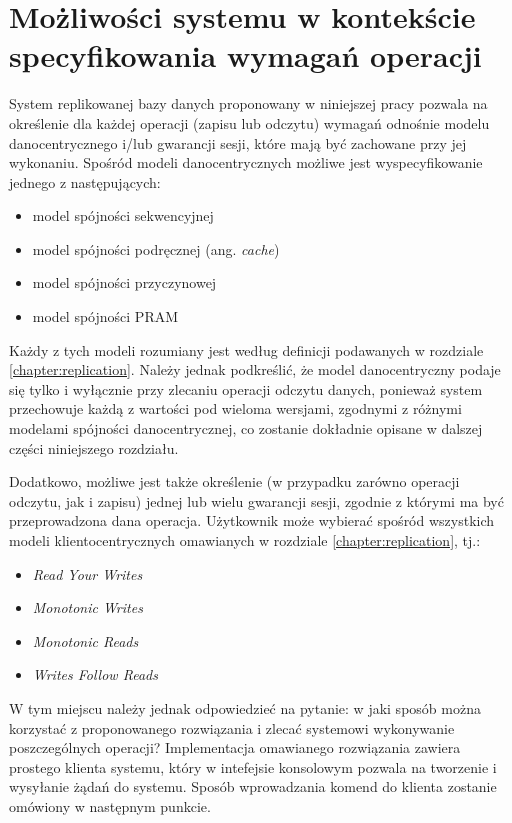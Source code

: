 \section{Możliwości systemu w kontekście specyfikowania wymagań operacji} \label{section:requirements_specifying}

System replikowanej bazy danych proponowany w niniejszej pracy pozwala na określenie dla każdej operacji (zapisu lub odczytu) wymagań odnośnie modelu danocentrycznego i/lub gwarancji sesji, które mają być zachowane przy jej wykonaniu. Spośród modeli danocentrycznych możliwe jest wyspecyfikowanie jednego z następujących:

\begin{itemize}
    \item model spójności sekwencyjnej
    \item model spójności podręcznej (ang. \textit{cache})
    \item model spójności przyczynowej
    \item model spójności PRAM
\end{itemize}

Każdy z tych modeli rozumiany jest według definicji podawanych w rozdziale \ref{chapter:replication}. Należy jednak podkreślić, że model danocentryczny podaje się tylko i wyłącznie przy zlecaniu operacji odczytu danych, ponieważ system przechowuje każdą z wartości pod wieloma wersjami, zgodnymi z różnymi modelami spójności danocentrycznej, co zostanie dokładnie opisane w dalszej części niniejszego rozdziału.

Dodatkowo, możliwe jest także określenie (w przypadku zarówno operacji odczytu, jak i zapisu) jednej lub wielu gwarancji sesji, zgodnie z którymi ma być przeprowadzona dana operacja. Użytkownik może wybierać spośród wszystkich modeli klientocentrycznych omawianych w rozdziale \ref{chapter:replication}, tj.:

\begin{itemize}
    \item \textit{Read Your Writes}
    \item \textit{Monotonic Writes}
    \item \textit{Monotonic Reads}
    \item \textit{Writes Follow Reads}
\end{itemize}

W tym miejscu należy jednak odpowiedzieć na pytanie: w jaki sposób można korzystać z proponowanego rozwiązania i zlecać systemowi wykonywanie poszczególnych operacji? Implementacja omawianego rozwiązania zawiera prostego klienta systemu, który w intefejsie konsolowym pozwala na tworzenie i wysyłanie żądań do systemu. Sposób wprowadzania komend do klienta zostanie omówiony w następnym punkcie.

